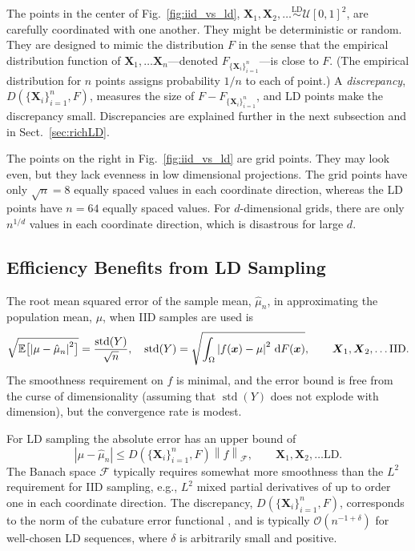 \documentclass[11pt]{NSFamsart}
\DeclareMathOperator{\std}{std}
\newcommand{\bbE}{\mathbb{E}}
\newcommand{\bx}{{\boldsymbol{x}}}
\newcommand{\bX}{{\boldsymbol{X}}}
\def\dif{\textup{d}}
\newcommand{\cx}{{\Omega}}
\newcommand{\calf}{{\mathcal{F}}}
\newcommand{\calu}{{\mathcal{U}}}
\def\abs#1{\ensuremath{\left \lvert #1 \right \rvert}}
\newcommand{\norm}[2][{}]{\ensuremath{\left \lVert #2 \right \rVert}_{#1}}
\newcommand{\Order}{\mathcal{O}}
\newcommand{\hmu}{\hat{\mu}}
\newcommand{\LDSim}{\overset{\text{LD}}{\sim}}
\begin{document}
The  points in the center of Fig.\ \ref{fig:iid_vs_ld}, $\bX_1, \bX_2,  \ldots \LDSim \calu[0,1]^2$, are carefully coordinated with one another.  They might be deterministic or random.  They are designed to mimic the distribution $F$  in the sense that the empirical distribution function of  $\bX_1, \ldots \bX_n$---denoted $F_{\{\bX_i\}_{i=1}^n}$---is close to $F$.  (The empirical distribution for $n$  points assigns probability $1/n$ to each of point.)  A \emph{discrepancy}, $D(\{\bX_i\}_{i=1}^n, F)$, measures the size of $F - F_{\{\bX_i\}_{i=1}^n}$, and LD points make the discrepancy small.  Discrepancies are explained further in the next subsection and in Sect.\ \ref{sec:richLD}.

The points on the right in Fig.\ \ref{fig:iid_vs_ld} are grid points. They may look even, but they lack evenness in low dimensional projections.  The grid points have only $\sqrt{n} = 8$ equally spaced values in each coordinate direction, whereas the LD points have $n=64$ equally spaced values.  For $d$-dimensional grids, there are only $n^{1/d}$ values in each coordinate direction, which is disastrous for  large $d$.

\subsection{Efficiency Benefits from LD Sampling}
The root mean squared error of the sample mean, $\hmu_n$, in approximating the population mean, $\mu$, when IID samples are used is 
\begin{equation}
    \sqrt{\bbE\bigl[\abs{\mu - \hmu_n}^2\bigr]} = \frac{\std(Y)}{\sqrt{n}},  \quad \std(Y) = \sqrt{\int_{\cx} \abs{f(\bx) - \mu}^2 \, \dif F(\bx)}, \qquad \bX_1, \bX_2, \ldots \text{IID}.
\end{equation}
The smoothness requirement on $f$ is minimal, and the error bound is free from the curse of dimensionality (assuming that $\std(Y)$ does not explode with dimension), but the convergence rate is modest.  

For LD sampling the absolute error has an upper bound of
\begin{equation} \label{eq:KH}
    \abs{\mu - \hmu_n} \le D(\{\bX_i\}_{i=1}^n, F) \norm[\calf]{f},  \qquad \bX_1, \bX_2, \ldots \text{LD}.
\end{equation}
The Banach space $\calf$ typically requires somewhat more smoothness than the $L^2$ requirement for IID sampling, e.g., $L^2$ mixed partial derivatives of up to order one in each coordinate direction. The discrepancy,  $D(\{\bX_i\}_{i=1}^n, F)$, corresponds to the norm of the cubature error functional \cite{Hic97a}, and is typically $\Order(n^{-1 + \delta})$ for well-chosen LD sequences, where $\delta$ is arbitrarily small and positive.
\end{document}
